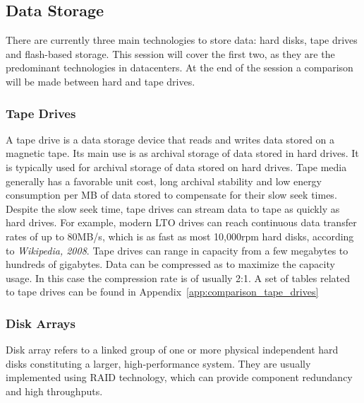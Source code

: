 {        \subsection{Data Storage} \label{sec2:data_storage}
            There are currently three main technologies to store data: hard disks, tape drives and flash-based storage. This session will cover the first two, as they are the predominant technologies in datacenters. At the end of the session a comparison will be made between hard and tape drives.
            
            \subsubsection*{Tape Drives}
                A tape drive is a data storage device that reads and writes data stored on a magnetic tape. Its main use is as archival storage of data stored in hard drives. It is typically used for archival storage of data stored on hard drives. 
Tape media generally has a favorable unit cost, long archival stability and low energy consumption per MB of data stored to compensate for their slow seek times. Despite the slow seek time, tape drives can stream data to tape as quickly as hard drives. For example, modern LTO drives can reach continuous data transfer rates of up to 80MB/s, which is as fast as most 10,000rpm hard disks, according to \emph{Wikipedia, 2008}. Tape drives can range in capacity from a few megabytes to hundreds of gigabytes. Data can be compressed as to maximize the capacity usage. In this case the compression rate is of usually 2:1. A set of tables related to tape drives can be found in Appendix~\ref{app:comparison_tape_drives}
            
            \subsubsection*{Disk Arrays}
                Disk array refers to a linked group of one or more physical independent hard disks constituting a larger, high-performance system. They are usually implemented using RAID technology, which can provide component redundancy and high throughputs.
        
}
